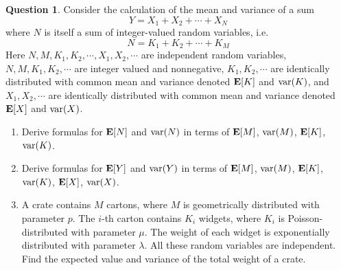 \documentclass[utf8]{article}
\theoremstyle{definition}%
\newtheorem{question}{Question} %
\theoremstyle{plain}%
\begin{document}
\begin{question}
    Consider the calculation of the mean and variance of a sum
    \begin{equation}
        Y = X_1 + X_2 + \cdots + X_N
    \end{equation}
    where $N$ is itself a sum of integer-valued random variables, i.e.
    \begin{equation}
        N = K_1 + K_2 + \cdots + K_M
    \end{equation}
    Here $N, M, K_1, K_2, \cdots, X_1, X_2, \cdots$ are independent random variables, $N, M, K_1, K_2, \cdots$ are integer valued and nonnegative, $K_1, K_2, \cdots$ are identically distributed with common mean and variance denoted $\mathbf{E}[K]$ and $\mathrm{var}(K)$, and $X_1, X_2, \cdots$ are identically distributed with common mean and variance denoted $\mathbf{E}[X]$ and $\mathrm{var}(X)$.
    \begin{enumerate}[label=(\alph*)]
        \item Derive formulas for $\mathbf{E}[N]$ and $\mathrm{var}(N)$ in terms of $\mathbf{E}[M]$, $\mathrm{var}(M)$, $\mathbf{E}[K]$, $\mathrm{var}(K)$.
        \item Derive formulas for $\mathbf{E}[Y]$ and $\mathrm{var}(Y)$ in terms of $\mathbf{E}[M]$, $\mathrm{var}(M)$, $\mathbf{E}[K]$, $\mathrm{var}(K)$, $\mathbf{E}[X]$, $\mathrm{var}(X)$.
        \item A crate contains $M$ cartons, where $M$ is geometrically distributed with parameter $p$. The $i$-th carton contains $K_i$ widgets, where $K_i$ is Poisson-distributed with parameter $\mu$. The weight of each widget is exponentially distributed with parameter $\lambda$. All these random variables are independent. Find the expected value and variance of the total weight of a crate.
    \end{enumerate}
\end{question}
\end{document}
